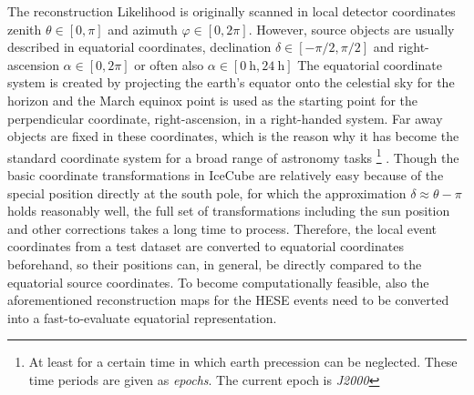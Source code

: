 The reconstruction Likelihood is originally scanned in local detector coordinates zenith $\theta\in[0, \pi]$ and azimuth $\varphi\in[0, 2\pi]$.
However, source objects are usually described in equatorial coordinates, declination $\delta\in[-\pi/2, \pi/2]$ and right-ascension $\alpha\in[0, 2\pi]$ or often also $\alpha\in[\SI{0}{\hour}, \SI{24}{\hour}]$
The equatorial coordinate system is created by projecting the earth's equator onto the celestial sky for the horizon and the March equinox point is used as the starting point for the perpendicular coordinate, right-ascension, in a right-handed system.
Far away objects are fixed in these coordinates, which is the reason why it has become the standard coordinate system for a broad range of astronomy tasks \footnote{At least for a certain time in which earth precession can be neglected. These time periods are given as \emph{epochs}. The current epoch is \emph{J2000}} \cite{Hohenkerk:1992AstroAlmanac}.
Though the basic coordinate transformations in IceCube are relatively easy because of the special position directly at the south pole, for which the approximation $\delta \approx \theta-\pi$ holds reasonably well, the full set of transformations including the sun position and other corrections takes a long time to process.
Therefore, the local event coordinates from a test dataset are converted to equatorial coordinates beforehand, so their positions can, in general, be directly compared to the equatorial source coordinates.
To become computationally feasible, also the aforementioned reconstruction maps for the HESE events need to be converted into a fast-to-evaluate equatorial representation.

